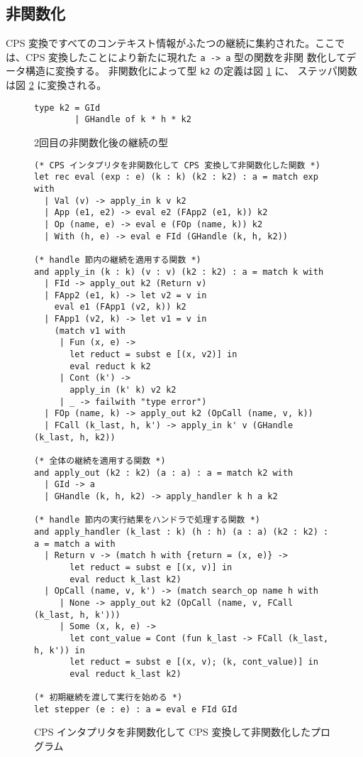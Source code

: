 \subsection{非関数化}
\label{subsection:4defun}

CPS 変換ですべてのコンテキスト情報がふたつの継続に集約された。ここで
は、CPS 変換したことにより新たに現れた \texttt{a -> a} 型の関数を非関
数化してデータ構造に変換する。
非関数化によって型 \texttt{k2} の定義は図 \ref{figure:k2_4defun} に、
ステッパ関数は図 \ref{figure:4defun} に変換される。


\begin{figure}
\begin{verbatim}
type k2 = GId
        | GHandle of k * h * k2
\end{verbatim}
\caption{2回目の非関数化後の継続の型}
\label{figure:k2_4defun}
\end{figure}

\begin{figure}
\begin{verbatim}
(* CPS インタプリタを非関数化して CPS 変換して非関数化した関数 *)
let rec eval (exp : e) (k : k) (k2 : k2) : a = match exp with
  | Val (v) -> apply_in k v k2
  | App (e1, e2) -> eval e2 (FApp2 (e1, k)) k2
  | Op (name, e) -> eval e (FOp (name, k)) k2
  | With (h, e) -> eval e FId (GHandle (k, h, k2))

(* handle 節内の継続を適用する関数 *)
and apply_in (k : k) (v : v) (k2 : k2) : a = match k with
  | FId -> apply_out k2 (Return v)
  | FApp2 (e1, k) -> let v2 = v in
    eval e1 (FApp1 (v2, k)) k2
  | FApp1 (v2, k) -> let v1 = v in
    (match v1 with
     | Fun (x, e) ->
       let reduct = subst e [(x, v2)] in
       eval reduct k k2
     | Cont (k') ->
       apply_in (k' k) v2 k2
     | _ -> failwith "type error")
  | FOp (name, k) -> apply_out k2 (OpCall (name, v, k))
  | FCall (k_last, h, k') -> apply_in k' v (GHandle (k_last, h, k2))

(* 全体の継続を適用する関数 *)
and apply_out (k2 : k2) (a : a) : a = match k2 with
  | GId -> a
  | GHandle (k, h, k2) -> apply_handler k h a k2

(* handle 節内の実行結果をハンドラで処理する関数 *)
and apply_handler (k_last : k) (h : h) (a : a) (k2 : k2) : a = match a with
  | Return v -> (match h with {return = (x, e)} ->
       let reduct = subst e [(x, v)] in
       eval reduct k_last k2)
  | OpCall (name, v, k') -> (match search_op name h with
     | None -> apply_out k2 (OpCall (name, v, FCall (k_last, h, k')))
     | Some (x, k, e) ->
       let cont_value = Cont (fun k_last -> FCall (k_last, h, k')) in
       let reduct = subst e [(x, v); (k, cont_value)] in
       eval reduct k_last k2)

(* 初期継続を渡して実行を始める *)
let stepper (e : e) : a = eval e FId GId
\end{verbatim}
\caption{CPS インタプリタを非関数化して CPS 変換して非関数化したプログラム}
\label{figure:4defun}
\end{figure}

